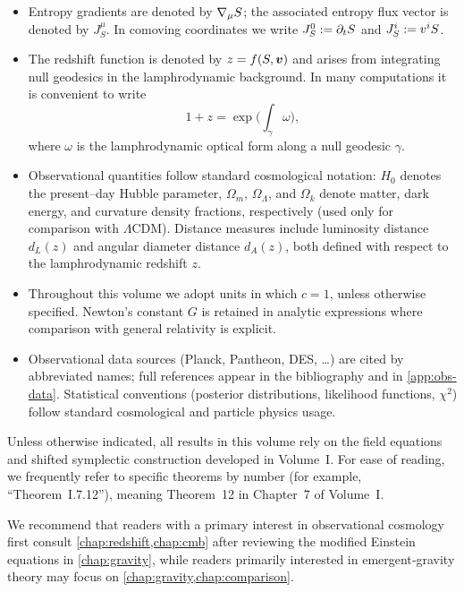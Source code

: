 \documentclass[11pt]{book}
\begin{document}
\begin{itemize}
  \item Entropy gradients are denoted by $\nabla_\mu S$; the associated
  entropy flux vector is denoted by $J^\mu_{\!S}$. In comoving coordinates we
  write $J^0_S := \partial_t S$ and $J^i_S := v^i S$.

  \item The redshift function is denoted by $z = f(S,\bm{v})$ and arises
  from integrating null geodesics in the lamphrodynamic background. In many
  computations it is convenient to write
  \[
    1 + z = \exp\!\Big(\int_\gamma \omega\Big),
  \]
  where $\omega$ is the lamphrodynamic optical form along a null geodesic
  $\gamma$.

  \item Observational quantities follow standard cosmological notation:
  $H_0$ denotes the present–day Hubble parameter, $\Omega_m$, $\Omega_\Lambda$,
  and $\Omega_k$ denote matter, dark energy, and curvature density fractions,
  respectively (used only for comparison with $\Lambda$CDM). Distance measures
  include luminosity distance $d_L(z)$ and angular diameter distance
  $d_A(z)$, both defined with respect to the lamphrodynamic redshift $z$.

  \item Throughout this volume we adopt units in which $c=1$, unless otherwise
  specified. Newton’s constant $G$ is retained in analytic expressions where
  comparison with general relativity is explicit.

  \item Observational data sources (Planck, Pantheon, DES, \ldots) are cited by
  abbreviated names; full references appear in the bibliography and in
  \cref{app:obs-data}. Statistical conventions (posterior distributions,
  likelihood functions, $\chi^2$) follow standard cosmological and particle
  physics usage.
\end{itemize}

Unless otherwise indicated, all results in this volume rely on the field
equations and shifted symplectic construction developed in Volume~I. For
ease of reading, we frequently refer to specific theorems by number (for
example, ``Theorem~I.7.12''), meaning Theorem~12 in Chapter~7 of Volume~I.

We recommend that readers with a primary interest in observational cosmology
first consult \cref{chap:redshift,chap:cmb} after reviewing the modified
Einstein equations in \cref{chap:gravity}, while readers primarily interested
in emergent‐gravity theory may focus on \cref{chap:gravity,chap:comparison}.
\end{document}
